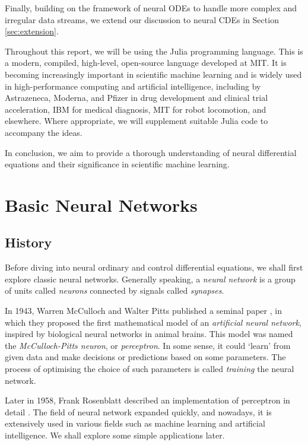 \documentclass[a4paper,11pt,titlepage]{article}
\theoremstyle{definition}
\theoremstyle{plain}
\theoremstyle{remark}
\begin{document}
Finally, building on the framework of neural ODEs to handle more complex and irregular data streams, we extend our discussion to neural CDEs in Section \ref{sec:extension}.

Throughout this report, we will be using the Julia programming language. This is a modern, compiled, high-level, open-source language developed at MIT. It is becoming increasingly important in scientific machine learning and is widely used in high-performance computing and artificial intelligence, including by Astrazeneca, Moderna, and Pfizer in drug development and clinical trial acceleration, IBM for medical diagnosis, MIT for robot locomotion, and elsewhere. \cite{SciMLSANUM2024} Where appropriate, we will supplement suitable Julia code to accompany the ideas.

In conclusion, we aim to provide a thorough understanding of neural differential equations and their significance in scientific machine learning.

\pagebreak
\section{Basic Neural Networks}
\label{sec:neuralnetworks}
\subsection{History}

Before diving into neural ordinary and control differential equations, we shall first explore classic neural networks. Generally speaking, a \textit{neural network} is a group of units called \textit{neurons} connected by signals called \textit{synapses}.

In 1943, Warren McCulloch and Walter Pitts published a seminal paper \cite{McCulloch1943}, in which they proposed the first mathematical model of an \textit{artificial neural network}, inspired by biological neural networks in animal brains. This model was named the \textit{McCulloch-Pitts neuron}, or \textit{perceptron}. In some sense, it could ‘learn’ from given data and make decisions or predictions based on some parameters. The process of optimising the choice of such parameters is called \textit{training} the neural network.

Later in 1958, Frank Rosenblatt described an implementation of perceptron in detail \cite{Rosenblatt1958}. The field of neural network expanded quickly, and nowadays, it is extensively used in various fields such as machine learning and artificial intelligence. We shall explore some simple applications later.
\end{document}
